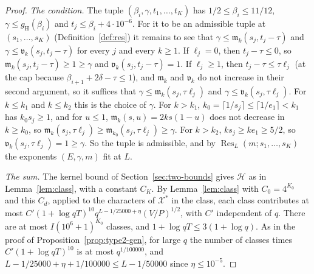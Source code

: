 \documentclass[11pt]{article}
\theoremstyle{definition}
\begin{document}
\begin{proof}
\emph{The condition.} The tuple $(\beta_i, \gamma, t_1, \dots, t_K)$ has $1/2 \le \beta_i \le 11/12$, $\gamma \le
g_{\mathrm H}(\beta_i)$ and $t_j \le \beta_i + 4 \cdot 10^{-6}$. For it to be an admissible tuple at $(s_1, \dots,
s_K)$ (Definition~\ref{def:res}) it remains to see that $\gamma \le \mathfrak m_k(s_j, t_j - \tau)$ and $\gamma
\le \mathfrak v_k(s_j, t_j - \tau)$ for every $j$ and every $k \ge 1$. If $\ell_j = 0$, then $t_j - \tau \le 0$, so
$\mathfrak m_k(s_j, t_j - \tau) \ge 1 \ge \gamma$ and $\mathfrak v_k(s_j, t_j - \tau) = 1$. If $\ell_j \ge 1$, then
$t_j - \tau \le \tau\ell_j$ (at the cap because $\beta_{i+1} + 2\delta - \tau \le 1$), and $\mathfrak m_k$ and
$\mathfrak v_k$ do not increase in their second argument, so it suffices that $\gamma \le \mathfrak m_k(s_j,
\tau\ell_j)$ and $\gamma \le \mathfrak v_k(s_j, \tau\ell_j)$. For $k \le k_1$ and $k \le k_2$ this is the choice of
$\gamma$. For $k > k_1$, $k_0 = \lceil 1/s_j \rceil \le \lceil 1/e_1 \rceil < k_1$ has $k_0 s_j \ge 1$, and for $u \le
1$, $\mathfrak m_k(s, u) = 2ks(1 - u)$ does not decrease in $k \ge k_0$, so $\mathfrak m_k(s_j, \tau\ell_j) \ge
\mathfrak m_{k_0}(s_j, \tau\ell_j) \ge \gamma$. For $k > k_2$, $ks_j \ge ke_1 \ge 5/2$, so $\mathfrak v_k(s_j,
\tau\ell_j) = 1 \ge \gamma$. So the tuple is admissible, and by $\operatorname{Res}_L(m; s_1, \dots, s_K)$ the
exponents $(E, \gamma, m)$ fit at $L$.

\emph{The sum.} The kernel bound of Section~\ref{sec:two-bounds} gives $\mathcal H$ as in Lemma~\ref{lem:class}, with a
constant $C_K$. By Lemma~\ref{lem:class} with $C_0 = 4^{K_0}$ and this $C_d$, applied to the characters of $\mathcal
X^*$ in the class, each class contributes at most $C'(1 + \log qT)^{10} q^{L - 1/25000 + \eta}(V/P)^{1/2}$, with $C'$
independent of $q$. There are at most $I(10^6 + 1)^{K_0}$ classes, and $1 + \log qT \le 3(1 + \log q)$. As in the proof
of Proposition~\ref{prop:type2-gen}, for large $q$ the number of classes times $C'(1 + \log qT)^{10}$ is at most
$q^{1/100000}$, and $L - 1/25000 + \eta + 1/100000 \le L - 1/50000$ since $\eta \le 10^{-5}$.
\end{proof}
\end{document}
